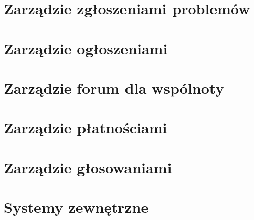 \section{Zarządzie zgłoszeniami problemów}

\section{Zarządzie ogłoszeniami}

\section{Zarządzie forum dla wspólnoty}

\section{Zarządzie płatnościami}

\section{Zarządzie głosowaniami}

\section{Systemy zewnętrzne}



